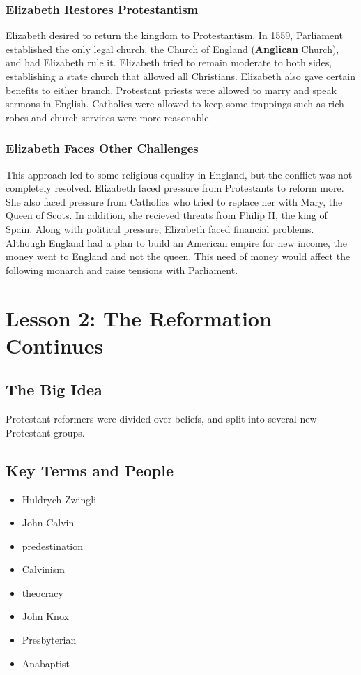 \documentclass[11pt]{article}
\begin{document}
\subsubsection{Elizabeth Restores Protestantism}
\label{sec:org30bf979}
Elizabeth desired to return the kingdom to Protestantism. In 1559, Parliament established the only legal church, the Church of England (\textbf{Anglican} Church), and had Elizabeth rule it. Elizabeth tried to remain moderate to both sides, establishing a state church that allowed all Christians. Elizabeth also gave certain benefits to either branch. Protestant priests were allowed to marry and speak sermons in English. Catholics were allowed to keep some trappings such as rich robes and church services were more reasonable.
\subsubsection{Elizabeth Faces Other Challenges}
\label{sec:orgfda67af}
This approach led to some religious equality in England, but the conflict was not completely resolved. Elizabeth faced pressure from Protestants to reform more. She also faced pressure from Catholics who tried to replace her with Mary, the Queen of Scots. In addition, she recieved threats from Philip II, the king of Spain. Along with political pressure, Elizabeth faced financial problems. Although England had a plan to build an American empire for new income, the money went to England and not the queen. This need of money would affect the following monarch and raise tensions with Parliament.
\section{Lesson 2: The Reformation Continues}
\label{sec:org2267f4b}
\subsection{The Big Idea}
\label{sec:orgaa38354}
Protestant reformers were divided over beliefs, and split into several new Protestant groups.
\subsection{Key Terms and People}
\label{sec:org7e6c783}
\begin{itemize}
\item Huldrych Zwingli
\item John Calvin
\item predestination
\item Calvinism
\item theocracy
\item John Knox
\item Presbyterian
\item Anabaptist
\end{itemize}
\end{document}
